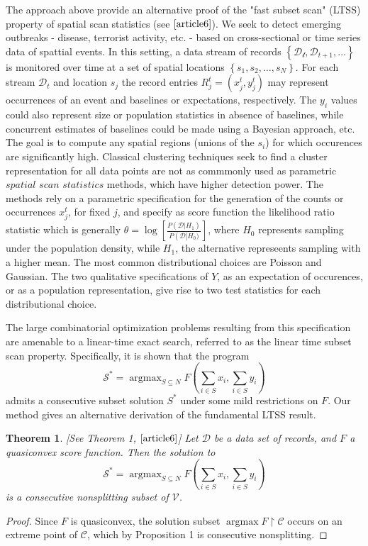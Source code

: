 \documentclass{article}
\newtheorem{thm}{Theorem}
\theoremstyle{case}
\DeclareMathOperator*{\argmax}{argmax} %
\begin{document}
The approach above provide an alternative proof of the "fast subset scan" (LTSS) property of spatial scan statistics (see $\cite{article6}$). We seek to detect emerging outbreaks - disease, terrorist activity, etc. - based on cross-sectional or time series data of spattial events. In this setting, a data stream of records $\left\lbrace \mathcal{D_t}, \mathcal{D}_{t+1}, \dots \right\rbrace$ is monitored over time at a set of spatial locations $\left\lbrace s_1, s_2, \dots, s_N \right\rbrace$. For each stream $\mathcal{D}_t$ and location $s_j$ the record entries $R^t_j = (x^t_j, y^t_j)$ may represent occurrences of an event and baselines or expectations, respectively. The $y_i$ values could also represent size or population statistics in absence of baselines, while concurrent estimates of baselines could be made using a Bayesian approach, etc. The goal is to compute any spatial regions (unions of the $s_i$) for which occurences are significantly high. Classical clustering techniques seek to find a cluster representation for all data points are not as commmonly used as parametric $\textit{spatial scan statistics}$ methods, which have higher detection power. The methods rely on a parametric specification for the generation of the counts or occurrences $x^t_j$, for fixed $j$, and specify as score function the likelihood ratio statistic which is generally $\theta = \log\left[ \frac{P\left( \mathcal{D} | H_1\right)}{P\left( \mathcal{D}\right | H_0)}\right]$, where $H_0$ represents sampling under the population density, while $H_1$, the alternative represeents sampling with a higher mean. The most common distributional choices are Poisson and Gaussian. The two qualitative specifications of $Y$, as an expectation of occurences, or as a population representation, give rise to two test statistics for each distributional choice. 

The large combinatorial optimization problems resulting from this specification are amenable to a linear-time exact search, referred to as the linear time subset scan property. Specifically, it is shown that the program
\[
\mathcal{S^*} = \argmax_{S \subseteq N} F(\sum_{i \in S}x_i, \sum_{i \in S}y_i)
\]
admits a consecutive subset solution $S^*$ under some mild restrictions on $F$. Our method gives an alternative derivation of the fundamental LTSS result.


\begin{thm} \label{thm3}
[See Theorem 1, $\cite{article6}$] Let $\mathcal{D}$ be a data set of records, and $F$ a quasiconvex score function. Then the solution to
\[
\mathcal{S^*} = \argmax_{S \subseteq N} F(\sum_{i \in S}x_i, \sum_{i \in S}y_i)
\]
is a consecutive nonsplitting subset of $\mathcal{V}$.
\end{thm}
\begin{proof}
Since $F$ is quasiconvex, the solution subset $\argmax F\restriction{\mathcal{C}}$ occurs on an extreme point of $\mathcal{C}$, which by Proposition 1 is consecutive nonsplitting.
\end{proof}
\end{document}
